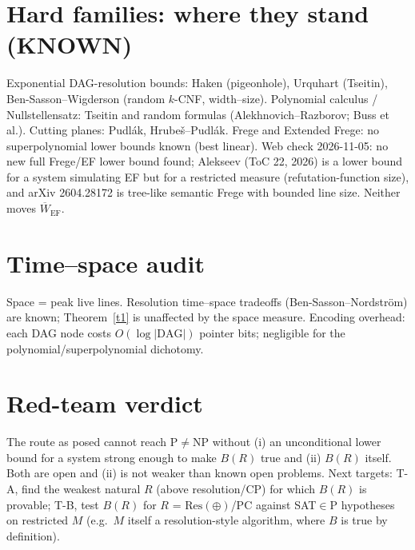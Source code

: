 \documentclass{article}
\begin{document}
\section*{Hard families: where they stand (KNOWN)}
Exponential DAG-resolution bounds: Haken (pigeonhole), Urquhart (Tseitin), Ben-Sasson--Wigderson (random $k$-CNF, width--size). Polynomial calculus / Nullstellensatz: Tseitin and random formulas (Alekhnovich--Razborov; Buss et al.). Cutting planes: Pudl\'ak, Hrube\v s--Pudl\'ak. Frege and Extended Frege: no superpolynomial lower bounds known (best linear). Web check 2026-11-05: no new full Frege/EF lower bound found; Alekseev (ToC 22, 2026) is a lower bound for a system simulating EF but for a restricted measure (refutation-function size), and arXiv 2604.28172 is tree-like semantic Frege with bounded line size. Neither moves $\overline W_{\mathrm{EF}}$.
\section*{Time--space audit}
Space = peak live lines. Resolution time--space tradeoffs (Ben-Sasson--Nordstr\"om) are known; Theorem~\ref{t1} is unaffected by the space measure. Encoding overhead: each DAG node costs $O(\log|\text{DAG}|)$ pointer bits; negligible for the polynomial/superpolynomial dichotomy.
\section*{Red-team verdict}
The route as posed cannot reach P$\neq$NP without (i) an unconditional lower bound for a system strong enough to make $B(R)$ true and (ii) $B(R)$ itself. Both are open and (ii) is not weaker than known open problems. Next targets: T-A, find the weakest natural $R$ (above resolution/CP) for which $B(R)$ is provable; T-B, test $B(R)$ for $R$ = $\mathrm{Res}(\oplus)$/PC against SAT$\in$P hypotheses on restricted $M$ (e.g.\ $M$ itself a resolution-style algorithm, where $B$ is true by definition).
\end{document}
